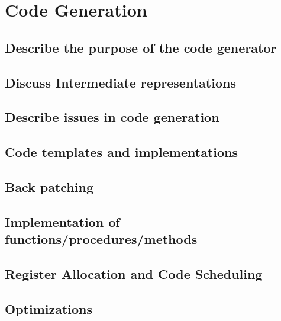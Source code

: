 \documentclass{article}
\begin{document}
\pagebreak

\section{Code Generation}

\subsection{Describe the purpose of the code generator}

\subsection{Discuss Intermediate representations}

\subsection{Describe issues in code generation}

\subsection{Code templates and implementations}

\subsection{Back patching}

\subsection{Implementation of functions/procedures/methods}

\subsection{Register Allocation and Code Scheduling}

\subsection{Optimizations}
\end{document}
